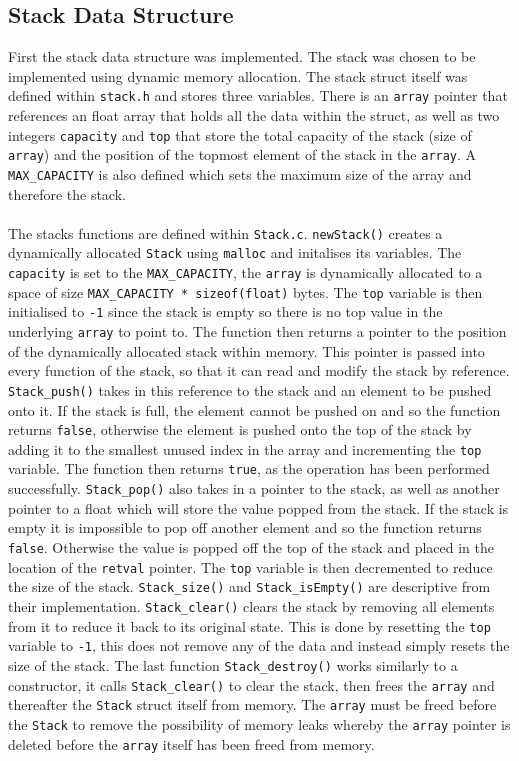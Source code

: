 \documentclass{article}
\begin{document}
\subsection{Stack Data Structure}
First the stack data structure was implemented. The stack was chosen to be implemented using dynamic memory allocation. The stack struct itself was defined within \verb+stack.h+ and stores three variables. There is an \verb+array+ pointer that references an float array that holds all the data within the struct, as well as two integers \verb+capacity+ and \verb+top+ that store the total capacity of the stack (size of \verb+array+) and the position of the topmost element of the stack in the \verb+array+. A \verb+MAX_CAPACITY+ is also defined which sets the maximum size of the array and therefore the stack. \\ \\ \noindent The stacks functions are defined within \verb+Stack.c+. \verb+newStack()+ creates a dynamically allocated \verb+Stack+ using \verb+malloc+ and initalises its variables. The \verb+capacity+ is set to the \verb+MAX_CAPACITY+, the \verb+array+ is dynamically allocated to a space of size \verb+MAX_CAPACITY * sizeof(float)+ bytes. The \verb+top+ variable is then initialised to \verb+-1+ since the stack is empty so there is no top value in the underlying \verb+array+ to point to. The function then returns a pointer to the position of the dynamically allocated stack within memory. This pointer is passed into every function of the stack, so that it can read and modify the stack by reference. \verb+Stack_push()+ takes in this reference to the stack and an element to be pushed onto it. If the stack is full, the element cannot be pushed on and so the function returns \verb+false+, otherwise the element is pushed onto the top of the stack by adding it to the smallest unused index in the array and incrementing the \verb+top+ variable. The function then returns \verb+true+, as the operation has been performed successfully. \verb+Stack_pop()+ also takes in a pointer to the stack, as well as another pointer to a float which will store the value popped from the stack. If the stack is empty it is impossible to pop off another element and so the function returns \verb+false+. Otherwise the value is popped off the top of the stack and placed in the location of the \verb+retval+ pointer. The \verb+top+ variable is then decremented to reduce the size of the stack. \verb+Stack_size()+ and \verb+Stack_isEmpty()+ are descriptive from their implementation. \verb+Stack_clear()+ clears the stack by removing all elements from it to reduce it back to its original state. This is done by resetting the \verb+top+ variable to \verb+-1+, this does not remove any of the data and instead simply resets the size of the stack. The last function \verb+Stack_destroy()+ works similarly to a constructor, it calls \verb+Stack_clear()+ to clear the stack, then frees the \verb+array+ and thereafter the \verb+Stack+ struct itself from memory. The \verb+array+ must be freed before the \verb+Stack+ to remove the possibility of memory leaks whereby the \verb+array+ pointer is deleted before the \verb+array+ itself has been freed from memory.
\end{document}
